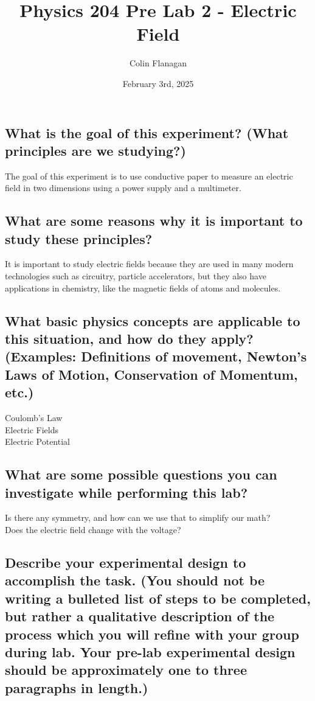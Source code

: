 \documentclass{article}
\title{Physics 204 Pre Lab 2 - Electric Field}
\author{Colin Flanagan}
\date{February 3rd, 2025}
\begin{document}
\maketitle

\subsection*{What is the goal of this experiment? (What principles are we studying?)}

    The goal of this experiment is to use conductive paper to measure an electric field in two dimensions using a power supply and a multimeter.
    

\subsection*{What are some reasons why it is important to study these principles?
}

  It is important to study electric fields because they are used in many modern technologies such as circuitry, particle accelerators, but they also have applications in chemistry, like the magnetic fields of atoms and molecules.
    
\subsection*{What basic physics concepts are applicable to this situation, and how do they apply? (Examples: Definitions of movement, Newton’s Laws of Motion, Conservation of Momentum, etc.)}

    Coulomb's Law\\

    Electric Fields\\

    Electric Potential\\


\subsection*{What are some possible questions you can investigate while performing this lab?
}

   Is there any symmetry, and how can we use that to simplify our math?\\

   Does the electric field change with the voltage?\\


\subsection*{Describe your experimental design to accomplish the task. (You should not be writing a bulleted list of steps to be completed, but rather a qualitative description of the process which you will refine with your group during lab. Your pre-lab experimental design should be approximately one to three paragraphs in length.)}
\end{document}
